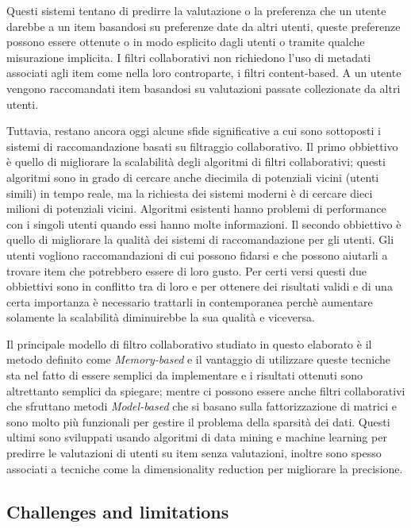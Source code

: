 Questi sistemi tentano di predirre la valutazione o la preferenza che un utente darebbe a un item basandosi su preferenze date da altri 
utenti, queste preferenze possono essere ottenute o in modo esplicito dagli utenti o tramite qualche misurazione implicita. 
I filtri collaborativi non richiedono l'uso di metadati associati agli item come nella loro controparte, i filtri content-based. A un 
utente vengono raccomandati item basandosi su valutazioni passate collezionate da altri utenti.

Tuttavia, restano ancora oggi alcune sfide significative a cui sono sottoposti i sistemi di raccomandazione basati su 
filtraggio collaborativo.
Il primo obbiettivo è quello di migliorare la scalabilità degli algoritmi di filtri collaborativi; questi algoritmi sono in grado di cercare
anche diecimila di potenziali vicini (utenti simili) in tempo reale, ma la richiesta dei sistemi moderni è di cercare dieci milioni di 
potenziali vicini. Algoritmi esistenti hanno problemi di performance con i singoli utenti quando essi hanno molte informazioni.
Il secondo obbiettivo è quello di migliorare la qualità dei sistemi di raccomandazione per gli utenti. Gli utenti vogliono
raccomandazioni di cui possono fidarsi e che possono aiutarli a trovare item che potrebbero essere di loro gusto.
Per certi versi questi due obbiettivi sono in conflitto tra di loro e per ottenere dei risultati validi e di una certa importanza è 
necessario trattarli in contemporanea perchè aumentare solamente la scalabilità diminuirebbe la sua qualità e viceversa. 
\cite{item-based-collaborative-filtering} 

Il principale modello di filtro collaborativo studiato in questo elaborato è il metodo definito come \textit{Memory-based} e il 
vantaggio di utilizzare queste tecniche sta nel fatto di essere semplici da implementare e i risultati ottenuti sono altrettanto 
semplici da spiegare; mentre ci possono essere anche filtri collaborativi che sfruttano metodi \textit{Model-based} che si basano sulla 
fattorizzazione di matrici e sono molto più funzionali per gestire il problema della sparsità dei dati. Questi ultimi sono sviluppati
usando algoritmi di data mining e machine learning per predirre le valutazioni di utenti su item senza valutazioni, inoltre sono spesso 
associati a tecniche come la dimensionality reduction per migliorare la precisione.



\subsection{Challenges and limitations} \hfill \break


